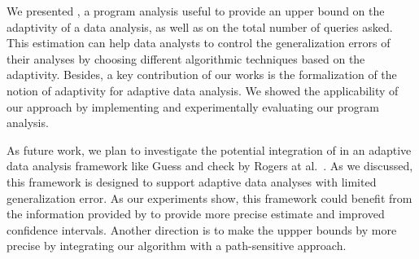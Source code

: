 We presented {\THESYSTEM}, a program analysis useful to provide an upper bound on the adaptivity of a data analysis, as well as on the total number of queries asked. This estimation can help data analysts to control the generalization errors of their analyses by choosing different algorithmic techniques based on the adaptivity. Besides, a key contribution of our works is the formalization of the notion of adaptivity for adaptive data analysis. We showed the applicability of our approach by implementing and experimentally evaluating our program analysis.

As future work, we plan to investigate the potential integration of  {\THESYSTEM} in an adaptive data analysis framework like Guess and check by Rogers at al.~\cite{RogersRSSTW20}. As we discussed, this framework is  designed to support adaptive data analyses with limited generalization error. As our experiments show, this framework could benefit from the information provided by {\THESYSTEM} to provide more precise estimate and improved confidence intervals. Another direction is to make 
the uppper bounds by {\THESYSTEM} more precise by integrating our algorithm with a path-sensitive approach.



